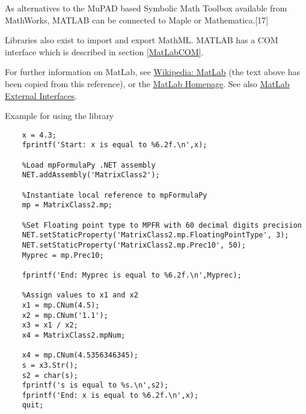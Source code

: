 	\vpara
	As alternatives to the MuPAD based Symbolic Math Toolbox available from MathWorks, MATLAB can be connected to Maple or Mathematica.[17]
	
	\vpara
	Libraries also exist to import and export MathML. MATLAB has a COM interface which is described in section \ref{MatLabCOM}.
	
	
	\vpara
	For further information on MatLab, see \href{http://en.wikipedia.org/wiki/MATLAB}{Wikipedia: MatLab} (the text above has been copied from this reference), or the  \href{http://www.mathworks.com/}{MatLab Homepage}. See also \href{http://www.mathworks.co.uk/help/matlab/external-interfaces.html}{MatLab External Interfaces}.	
	
	
	
	\newpage
	Example for using the library
	
	\begin{lstlisting}
	x = 4.3;
	fprintf('Start: x is equal to %6.2f.\n',x);
	
	%Load mpFormulaPy .NET assembly 
	NET.addAssembly('MatrixClass2');
	
	%Instantiate local reference to mpFormulaPy
	mp = MatrixClass2.mp;
	
	%Set Floating point type to MPFR with 60 decimal digits precision
	NET.setStaticProperty('MatrixClass2.mp.FloatingPointType', 3);
	NET.setStaticProperty('MatrixClass2.mp.Prec10', 50);
	Myprec = mp.Prec10;
	
	fprintf('End: Myprec is equal to %6.2f.\n',Myprec);
	
	%Assign values to x1 and x2
	x1 = mp.CNum(4.5);
	x2 = mp.CNum('1.1');
	x3 = x1 / x2;
	x4 = MatrixClass2.mpNum;
	
	x4 = mp.CNum(4.5356346345);
	s = x3.Str();
	s2 = char(s);
	fprintf('s is equal to %s.\n',s2);
	fprintf('End: x is equal to %6.2f.\n',x);
	quit;
	\end{lstlisting}
	
	
	
	
	
